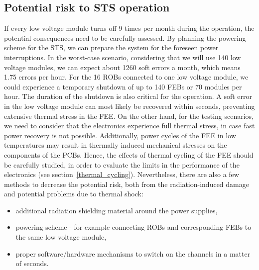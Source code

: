 \subsection{Potential risk to STS operation}
If every low voltage module turns off 9 times per month during the operation, the potential consequences need to be carefully assessed. By planning the powering scheme for the \gls{STS}, we can prepare the system for the foreseen power interruptions. In the worst-case scenario, considering that we will use 140 low voltage modules, we can expect about 1260 soft errors a month, which means 1.75 errors per hour.  For the 16 \glspl{ROB} connected to one low voltage module, we could experience a temporary shutdown of up to 140 \glspl{FEB} or 70 modules per hour.  The duration of the shutdown is also critical for the operation. A soft error in the low voltage module can most likely be recovered within seconds, preventing extensive thermal stress in the FEE. On the other hand, for the testing scenarios, we need to consider that the electronics experience full thermal stress, in case fast power recovery is not possible. Additionally, power cycles of the \gls{FEE} in low temperatures may result in thermally induced mechanical stresses on the components of the \glspl{PCB}. Hence, the effects of thermal cycling of the \gls{FEE} should be carefully studied, in order to evaluate the limits in the performance of the electronics  (see section~\ref{thermal_cycling}). Nevertheless, there are also a few methods to decrease the potential risk, both from the radiation-induced damage and potential problems due to thermal shock:
\begin{itemize}
    \item additional radiation shielding material around the power supplies,
    \item powering scheme - for example connecting \glspl{ROB} and corresponding \glspl{FEB} to the same low voltage module,
    \item proper software/hardware mechanisms to switch on the channels in a matter of seconds.
\end{itemize}
\newpage
